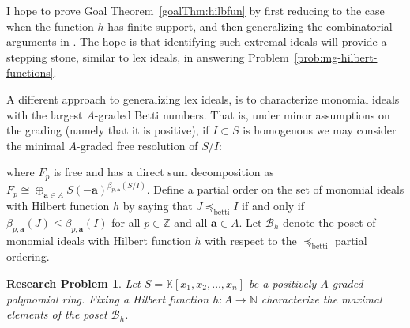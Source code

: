 \documentclass[11pt,reqno]{amsart}
\newtheorem{problem}[lemma]{Research Problem}
\theoremstyle{remark}
\newcommand{\doot}{\bullet}
\renewcommand{\aa}{\mathbf a}
\newcommand{\cB}{\mathcal{B}}
\newcommand{\K}{\mathbb{K}}
\newcommand{\N}{\mathbb{N}}
\newcommand{\Z}{\mathbb{Z}}
\begin{document}
I hope to prove Goal Theorem~\ref{goalThm:hilbfun} by first reducing to the case when the function $h$ has finite support, and then generalizing the combinatorial arguments in \cite{maclaganSmith10}. The hope is that identifying such extremal ideals will provide a stepping stone, similar to lex ideals, in answering Problem~\ref{prob:mg-hilbert-functions}.

A different approach to generalizing lex ideals, is to characterize monomial ideals with the largest $A$-graded Betti numbers. That is, under minor assumptions on the grading (namely that it is positive), if $I\subset S$ is homogenous we may consider the minimal $A$-graded free resolution of $S/I$:
\begin{center}
\end{center}
where $F_{p}$ is free and has a direct sum decomposition as $F_{p}\cong \oplus_{\aa\in A}S(-\aa)^{\beta_{p,\aa}(S/I)}$. Define a partial order on the set of monomial ideals with Hilbert function $h$ by saying that $J\preceq_{\text{betti}} I$ if and only if $\beta_{p,\aa}(J) \leq \beta_{p,\aa}(I)$ for all $p\in \Z$ and all $\aa\in A$. Let $\cB_{h}$ denote the poset of monomial ideals with Hilbert function $h$ with respect to the $\preceq_{\text{betti}}$ partial ordering.



\begin{problem}\label{prob:mg-BHP}
Let $S=\K[x_{1},x_{2},\ldots,x_{n}]$ be a positively $A$-graded polynomial ring. Fixing a Hilbert function $h:A\to \N$ characterize the maximal elements of the poset $\cB_{h}$. 
\end{problem}
\end{document}
